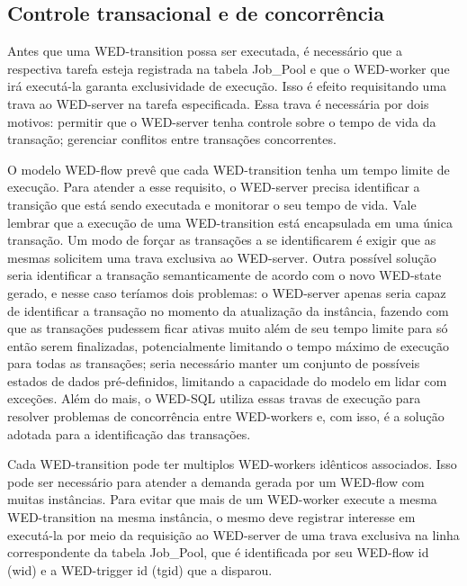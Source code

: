 \documentclass[conference]{IEEEtran}
\begin{document}
\subsection{Controle transacional e de concorrência}

Antes que uma WED-transition possa ser executada, é necessário que a respectiva tarefa esteja registrada na tabela Job\_Pool e que
o WED-worker que irá executá-la garanta exclusividade de execução. Isso é efeito requisitando uma trava ao WED-server na tarefa
especificada. Essa trava é necessária por dois motivos: permitir que o WED-server tenha controle sobre o tempo de vida da transação;
gerenciar conflitos entre transações concorrentes.

\par O modelo WED-flow prevê que cada WED-transition tenha um tempo limite de execução. Para atender a esse requisito, o WED-server
precisa identificar a transição que está sendo executada e monitorar o seu tempo de vida. Vale lembrar que a execução de uma
WED-transition está encapsulada em uma única transação. Um modo de forçar as transações a se identificarem é exigir que as mesmas
solicitem uma trava exclusiva ao WED-server. Outra possível solução seria identificar a transação semanticamente de acordo
com o novo WED-state gerado, e nesse caso teríamos dois problemas: o WED-server apenas seria capaz de identificar a transação
no momento da atualização da instância, fazendo com que as transações pudessem ficar ativas muito além de seu tempo limite para
só então serem finalizadas, potencialmente limitando o tempo máximo de execução para todas as transações; seria necessário manter 
um conjunto de possíveis estados de dados pré-definidos, limitando a capacidade do modelo em lidar com exceções. Além do mais,
o WED-SQL utiliza essas travas de execução para resolver problemas de concorrência entre WED-workers e, com isso,
é a solução adotada para a identificação das transações. 


\par Cada WED-transition pode ter multiplos WED-workers idênticos associados. Isso pode ser necessário para atender a demanda 
gerada por um WED-flow com muitas instâncias. Para evitar que mais de um WED-worker execute a mesma WED-transition na mesma
instância, o mesmo deve registrar interesse em executá-la por meio da requisição ao WED-server de uma trava exclusiva na linha
correspondente da tabela Job\_Pool, que é identificada por seu WED-flow id (wid) e a WED-trigger id (tgid) que a disparou.
\end{document}

